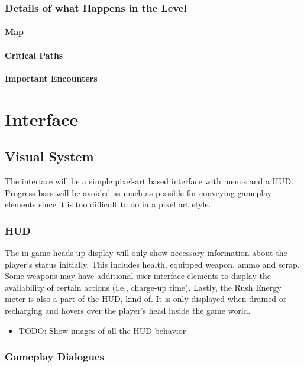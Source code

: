 \documentclass[12pt]{article}
\begin{document}
\subsubsection{Details of what Happens in the Level}

\paragraph{Map}

\paragraph{Critical Paths}

\paragraph{Important Encounters}

\section{Interface}

\subsection{Visual System}

The interface will be a simple pixel-art based interface with menus and a HUD. Progress bars will be avoided as much as possible for conveying gameplay elements since it is too difficult to do in a pixel art style. 

\subsubsection{HUD}

The in-game heads-up display will only show necessary information about the player's status initially. This includes health, equipped weapon, ammo and scrap. Some weapons may have additional user interface elements to display the availability of certain actions (i.e., charge-up time). Lastly, the Rush Energy meter is also a part of the HUD, kind of. It is only displayed when drained or recharging and hovers over the player's head inside the game world. 

\begin{itemize}
	\item TODO: Show images of all the HUD behavior
\end{itemize}

\subsubsection{Gameplay Dialogues}
\end{document}
